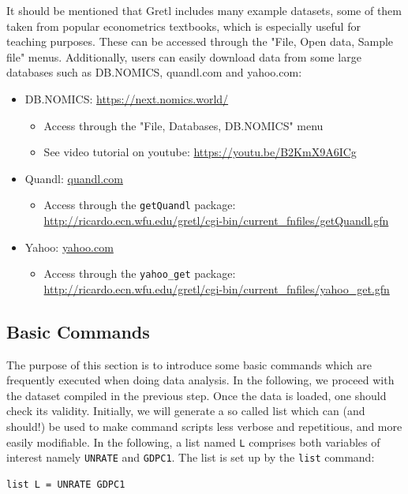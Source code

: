 \documentclass[11pt]{article}
\begin{document}
It should be mentioned that Gretl includes many example datasets, some of them taken from popular econometrics textbooks, which is especially useful for teaching purposes. These can be accessed through the "File, Open data, Sample file" menus. Additionally, users can easily download data from some large databases such as DB.NOMICS, quandl.com and yahoo.com:
\begin{itemize}
	\item DB.NOMICS: \url{https://next.nomics.world/}
	\begin{itemize}
		\item Access through the "File, Databases, DB.NOMICS" menu
		\item See video tutorial on youtube: \url{https://youtu.be/B2KmX9A6ICg}
	\end{itemize}
	\item Quandl: \url{quandl.com}
	\begin{itemize}
		\item Access through the \texttt{getQuandl} package: \url{http://ricardo.ecn.wfu.edu/gretl/cgi-bin/current_fnfiles/getQuandl.gfn}		
	\end{itemize}
	\item Yahoo: \url{yahoo.com}
	\begin{itemize}
		\item Access through the \texttt{yahoo\_get} package: \url{http://ricardo.ecn.wfu.edu/gretl/cgi-bin/current_fnfiles/yahoo_get.gfn}
	\end{itemize}
\end{itemize}



\subsection{Basic Commands}
The purpose of this section is to introduce some basic commands which are frequently executed when doing data analysis. In the following, we proceed with the dataset compiled in the previous step. Once the data is loaded, one should check its validity. %
Initially, we will generate a so called list which can (and should!) be used to make command scripts less verbose and repetitious, and more easily modifiable. In the following, a list named \texttt{L} comprises both variables of interest namely \texttt{UNRATE} and \texttt{GDPC1}. The list is set up by the \texttt{list} command:
\begin{Verbatim}[baselinestretch=0.75, fontsize=\small]
list L = UNRATE GDPC1
\end{Verbatim}
\end{document}
